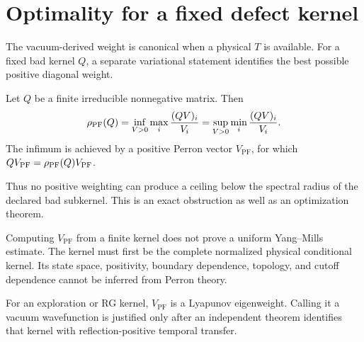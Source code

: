 \section{Optimality for a fixed defect kernel}

The vacuum-derived weight is canonical when a physical \(T\) is available.
For a fixed bad kernel \(Q\), a separate variational statement identifies the
best possible positive diagonal weight.

\begin{theorem}\label{thm:cw}
Let \(Q\) be a finite irreducible nonnegative matrix.  Then
\begin{equation}\label{eq:cw}
 \rho_{\mathrm{PF}}(Q)
 =\inf_{V>0}\max_i\frac{(QV)_i}{V_i}
 =\sup_{V>0}\min_i\frac{(QV)_i}{V_i}.
\end{equation}
The infimum is achieved by a positive Perron vector
\(V_{\mathrm{PF}}\), for which
\(QV_{\mathrm{PF}}=\rho_{\mathrm{PF}}(Q)V_{\mathrm{PF}}\).
\end{theorem}

Thus no positive weighting can produce a ceiling below the spectral radius of
the declared bad subkernel.  This is an exact obstruction as well as an
optimization theorem.

\begin{warning}
Computing \(V_{\mathrm{PF}}\) from a finite kernel does not prove a uniform
Yang--Mills estimate.  The kernel must first be the complete normalized
physical conditional kernel.  Its state space, positivity, boundary
dependence, topology, and cutoff dependence cannot be inferred from Perron
theory.
\end{warning}

For an exploration or RG kernel, \(V_{\mathrm{PF}}\) is a Lyapunov
eigenweight.  Calling it a vacuum wavefunction is justified only after an
independent theorem identifies that kernel with reflection-positive temporal
transfer.
